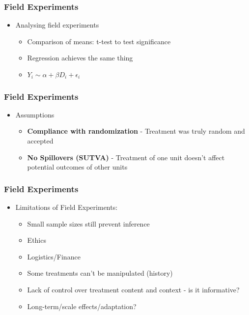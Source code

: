 \documentclass[xcolor=x11names,compress]{beamer}\usepackage[]{graphicx}\usepackage[]{color}
\renewcommand{\(}{\begin{columns}}
\renewcommand{\)}{\end{columns}}
\newcommand{\<}[1]{\begin{column}{#1}}
\renewcommand{\>}{\end{column}}
\begin{document}
\begin{frame}
\frametitle{Field Experiments}
\begin{itemize}
\item Analysing field experiments
\begin{itemize}
\item Comparison of means: t-test to test significance
\item Regression achieves the same thing
\item $Y_i \sim \alpha + \beta D_i + \epsilon_i$ 
\end{itemize}
\end{itemize}
\end{frame}

\begin{frame}
\frametitle{Field Experiments}
\begin{itemize}
\item Assumptions
\begin{itemize}
\item \textbf{Compliance with randomization} - Treatment was truly random and accepted
\item \textbf{No Spillovers (SUTVA)} - Treatment of one unit doesn't affect potential outcomes of other units
\end{itemize}
\end{itemize}
\end{frame}

\begin{frame}
\frametitle{Field Experiments}
\begin{itemize}
\item Limitations of Field Experiments: 
\pause
\begin{itemize}
\item Small sample sizes still prevent inference
\item Ethics
\item Logistics/Finance
\item Some treatments can't be manipulated (history)
\item Lack of control over treatment content and context - is it informative?
\item Long-term/scale effects/adaptation?
\end{itemize}
\end{itemize}
\end{frame}
\end{document}
